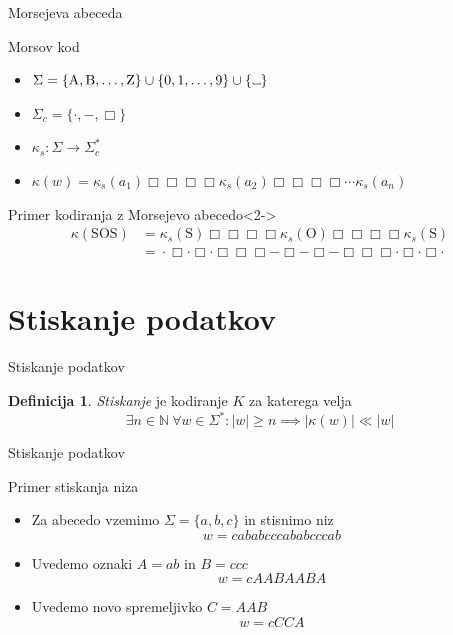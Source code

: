 \documentclass{beamer}
\newcommand{\N}{\mathbb{N}}
\theoremstyle{definition} %
\newtheorem{definicija}{Definicija}[section]
\newcommand\Vtextvisiblespace[1][.3em]{%
\mbox{\kern.06em\vrule height.3ex}%
\vbox{\hrule width#1}%
\hbox{\vrule height.3ex}}
\begin{document}
\begin{frame}{Morsejeva abeceda}
    \begin{block}{Morsov kod}
        \begin{itemize}
            \item  $ \Sigma = \{ \text{A},  \text{B}, \ldots, \text{Z} \} \cup \{ 0, 1, \ldots, 9 \}
            \cup \{ \Vtextvisiblespace[5pt] \} $
            \item $ \Sigma_c = \{ \cdot ,-, \Box \} $
            \item $ \kappa_s \colon \Sigma \to \Sigma_c^* $
            \item $ \kappa(w) = \kappa_s(a_1) \Box\Box\Box\Box  \kappa_s(a_2) \Box \Box\Box\Box \cdots \kappa_s(a_n) $
        \end{itemize}
    \end{block}
    \begin{exampleblock}{Primer kodiranja z Morsejevo abecedo}<2->
        \[
        \begin{split}
            \kappa(\text{SOS}) & = \kappa_s(\text{S}) \Box\Box\Box\Box \kappa_s(\text{O}) \Box\Box\Box\Box \kappa_s(\text{S})\\
            & = \phantom{} \cdot\Box\cdot\Box\cdot \Box\Box\Box -\Box-\Box- \Box\Box\Box \cdot\Box\cdot\Box\cdot \phantom{}  
        \end{split}
        \]
    \end{exampleblock}
\end{frame}

\section*{Stiskanje podatkov}

\begin{frame}{Stiskanje podatkov}    
    \begin{definicija}
        \textit{Stiskanje} je kodiranje $ K $ za katerega velja 
        \[ 
        \exists n \in \N \ \forall w \in \Sigma^* \colon |w| \geq n \implies
        \left\lvert \kappa(w)\right\rvert \ll \left\lvert w \right\rvert
        \]
    \end{definicija}
\end{frame}

\begin{frame}{Stiskanje podatkov}
    \begin{exampleblock}{Primer stiskanja niza}
        \begin{itemize}
            \item Za abecedo vzemimo $ \Sigma = \{ a,b,c \} $ in stisnimo niz
            \[
                w = \mathit{cababcccababcccab}
            \]
            \item<2-> Uvedemo oznaki $ A = \mathit{ab} $ in $ B = \mathit{ccc} $ 
            \[
                w = \mathit{cAABAABA}
            \]
            \item<3-> Uvedemo novo spremeljivko $ C = \mathit{AAB} $
            \[
                w = \mathit{cCCA}
            \]    
        \end{itemize}
    \end{exampleblock}
\end{frame}
\end{document}
